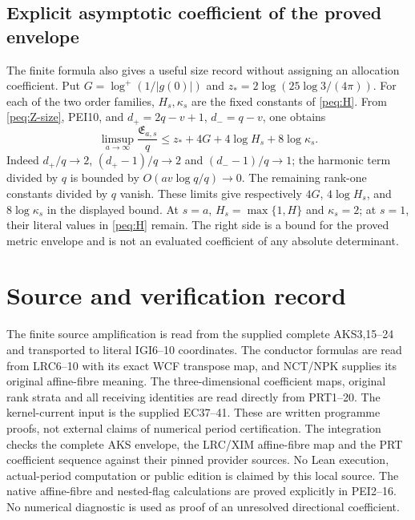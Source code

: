 \documentclass[11pt,a4paper]{article}
\begin{document}
\subsection{Explicit asymptotic coefficient of the proved envelope}

The finite formula also gives a useful size record without assigning
an allocation coefficient. Put
$G=\log^+(1/|g(0)|)$ and
$z_* =2\log(25\log3/(4\pi))$.
For each of the two order families, $H_s,\kappa_s$ are the fixed
constants of \eqref{peq:H}. From \eqref{peq:Z-size},
PEI10, and $d_+=2q-v+1$, $d_-=q-v$, one obtains
\[
 \limsup_{a\to\infty}\frac{\mathfrak E_{a,s}}q
 \le z_*+4G+4\log H_s+8\log\kappa_s.                            \tag{PEI17}
\]
Indeed $d_+/q\to2$, $(d_+-1)/q\to2$ and
$(d_--1)/q\to1$; the harmonic term divided by $q$ is bounded
by $O(av\log q/q)\to0$. The remaining rank-one constants divided
by $q$ vanish. These limits give respectively $4G$,
$4\log H_s$, and $8\log\kappa_s$ in the displayed bound.
At $s=a$, $H_s=\max\{1,H\}$ and $\kappa_s=2$;
at $s=1$, their literal values in \eqref{peq:H} remain.
The right side is a bound for the proved metric envelope and is
not an evaluated coefficient of any absolute determinant.


\section*{Source and verification record}
The finite source amplification is read from the supplied complete AKS3,15--24 and transported to literal IGI6--10 coordinates. The conductor formulas are read from LRC6--10 with its exact WCF transpose map, and NCT/NPK supplies its original affine-fibre meaning. The three-dimensional coefficient maps, original rank strata and all receiving identities are read directly from PRT1--20. The kernel-current input is the supplied EC37--41. These are written programme proofs, not external claims of numerical period certification. The integration checks the complete AKS envelope, the LRC/XIM affine-fibre map and the PRT coefficient sequence against their pinned provider sources. No Lean execution, actual-period computation or public edition is claimed by this local source. The native affine-fibre and nested-flag calculations are proved explicitly in PEI2--16. No numerical diagnostic is used as proof of an unresolved directional coefficient.
\end{document}
